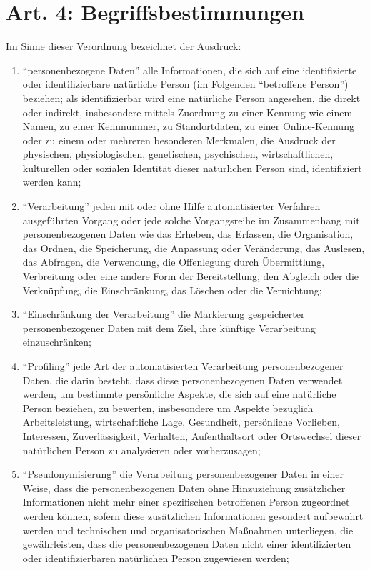 \documentclass[A4, 12pt]{scrbook}
\begin{document}
    \section{Art. 4: Begriffsbestimmungen}
    Im Sinne dieser Verordnung bezeichnet der Ausdruck:
        \begin{enumerate}[label=\arabic*.]
            \item ``personenbezogene Daten'' alle Informationen, die sich auf eine identifizierte oder identifizierbare natürliche Person (im Folgenden ``betroffene Person'') beziehen; als identifizierbar wird eine natürliche Person angesehen, die direkt oder indirekt, insbesondere mittels Zuordnung zu einer Kennung wie einem Namen, zu einer Kennnummer, zu Standortdaten, zu einer Online-Kennung oder zu einem oder mehreren besonderen Merkmalen, die Ausdruck der physischen, physiologischen, genetischen, psychischen, wirtschaftlichen, kulturellen oder sozialen Identität dieser natürlichen Person sind, identifiziert werden kann; 
            \item ``Verarbeitung'' jeden mit oder ohne Hilfe automatisierter Verfahren ausgeführten Vorgang oder jede solche Vorgangsreihe im Zusammenhang mit personenbezogenen Daten wie das Erheben, das Erfassen, die Organisation, das Ordnen, die Speicherung, die Anpassung oder Veränderung, das Auslesen, das Abfragen, die Verwendung, die Offenlegung durch Übermittlung, Verbreitung oder eine andere Form der Bereitstellung, den Abgleich oder die Verknüpfung, die Einschränkung, das Löschen oder die Vernichtung;
            \item ``Einschränkung der Verarbeitung'' die Markierung gespeicherter personenbezogener Daten mit dem Ziel, ihre künftige Verarbeitung einzuschränken;
            \item ``Profiling'' jede Art der automatisierten Verarbeitung personenbezogener Daten, die darin besteht, dass diese personenbezogenen Daten verwendet werden, um bestimmte persönliche Aspekte, die sich auf eine natürliche Person beziehen, zu bewerten, insbesondere um Aspekte bezüglich Arbeitsleistung, wirtschaftliche Lage, Gesundheit, persönliche Vorlieben, Interessen, Zuverlässigkeit, Verhalten, Aufenthaltsort oder Ortswechsel dieser natürlichen Person zu analysieren oder vorherzusagen;
            \item ``Pseudonymisierung'' die Verarbeitung personenbezogener Daten in einer Weise, dass die personenbezogenen Daten ohne Hinzuziehung zusätzlicher Informationen nicht mehr einer spezifischen betroffenen Person zugeordnet werden können, sofern diese zusätzlichen Informationen gesondert aufbewahrt werden und technischen und organisatorischen Maßnahmen unterliegen, die gewährleisten, dass die personenbezogenen Daten nicht einer identifizierten oder identifizierbaren natürlichen Person zugewiesen werden; 

\end{enumerate}
\end{document}
